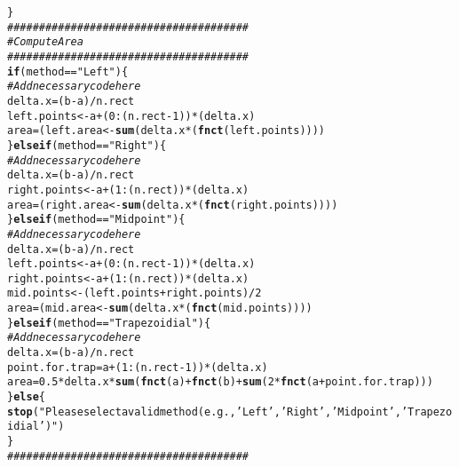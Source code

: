 \documentclass{article}\usepackage[]{graphicx}\usepackage[]{xcolor}
\makeatletter
\newcommand{\hlnum}[1]{\textcolor[rgb]{0.686,0.059,0.569}{#1}}%
\newcommand{\hlsng}[1]{\textcolor[rgb]{0.192,0.494,0.8}{#1}}%
\newcommand{\hlcom}[1]{\textcolor[rgb]{0.678,0.584,0.686}{\textit{#1}}}%
\newcommand{\hlopt}[1]{\textcolor[rgb]{0,0,0}{#1}}%
\newcommand{\hldef}[1]{\textcolor[rgb]{0.345,0.345,0.345}{#1}}%
\newcommand{\hlkwa}[1]{\textcolor[rgb]{0.161,0.373,0.58}{\textbf{#1}}}%
\newcommand{\hlkwb}[1]{\textcolor[rgb]{0.69,0.353,0.396}{#1}}%
\newcommand{\hlkwd}[1]{\textcolor[rgb]{0.737,0.353,0.396}{\textbf{#1}}}%
\newenvironment{kframe}{%
 \def\at@end@of@kframe{}%
 \ifinner\ifhmode%
  \def\at@end@of@kframe{\end{minipage}}%
  \begin{minipage}{\columnwidth}%
 \fi\fi%
 \def\FrameCommand##1{\hskip\@totalleftmargin \hskip-\fboxsep
 \colorbox{shadecolor}{##1}\hskip-\fboxsep
     \hskip-\linewidth \hskip-\@totalleftmargin \hskip\columnwidth}%
 \MakeFramed {\advance\hsize-\width
   \@totalleftmargin\z@ \linewidth\hsize
   \@setminipage}}%
 {\par\unskip\endMakeFramed%
 \at@end@of@kframe}
\newenvironment{knitrout}{}{} %
\makeatother
\begin{document}
\begin{enumerate}
\begin{enumerate}
\begin{knitrout}
\begin{kframe}
\begin{alltt}
  \hldef{\}}
  \hlcom{######################################}
  \hlcom{# Compute Area}
  \hlcom{######################################}
  \hlkwa{if}\hldef{(method} \hlopt{==} \hlsng{"Left"}\hldef{)\{}
    \hlcom{# Add necessary code here}
    \hldef{delta.x} \hlkwb{=} \hldef{(b}\hlopt{-}\hldef{a)}\hlopt{/}\hldef{n.rect}
    \hldef{left.points} \hlkwb{<-} \hldef{a} \hlopt{+} \hldef{(}\hlnum{0}\hlopt{:}\hldef{(n.rect}\hlopt{-}\hlnum{1}\hldef{))}\hlopt{*}\hldef{(delta.x)}
    \hldef{area} \hlkwb{=} \hldef{(left.area} \hlkwb{<-} \hlkwd{sum}\hldef{(delta.x}\hlopt{*}\hldef{(}\hlkwd{fnct}\hldef{(left.points))))}
  \hldef{\}}\hlkwa{else if}\hldef{(method} \hlopt{==} \hlsng{"Right"}\hldef{)\{}
    \hlcom{# Add necessary code here}
    \hldef{delta.x} \hlkwb{=} \hldef{(b}\hlopt{-}\hldef{a)}\hlopt{/}\hldef{n.rect}
    \hldef{right.points} \hlkwb{<-} \hldef{a} \hlopt{+} \hldef{(}\hlnum{1}\hlopt{:}\hldef{(n.rect))}\hlopt{*}\hldef{(delta.x)}
    \hldef{area} \hlkwb{=} \hldef{(right.area} \hlkwb{<-} \hlkwd{sum}\hldef{(delta.x}\hlopt{*}\hldef{(}\hlkwd{fnct}\hldef{(right.points))))}
  \hldef{\}}\hlkwa{else if}\hldef{(method} \hlopt{==} \hlsng{"Midpoint"}\hldef{)\{}
    \hlcom{# Add necessary code here}
    \hldef{delta.x} \hlkwb{=} \hldef{(b}\hlopt{-}\hldef{a)}\hlopt{/}\hldef{n.rect}
    \hldef{left.points} \hlkwb{<-} \hldef{a} \hlopt{+} \hldef{(}\hlnum{0}\hlopt{:}\hldef{(n.rect}\hlopt{-}\hlnum{1}\hldef{))}\hlopt{*}\hldef{(delta.x)}
    \hldef{right.points} \hlkwb{<-} \hldef{a} \hlopt{+} \hldef{(}\hlnum{1}\hlopt{:}\hldef{(n.rect))}\hlopt{*}\hldef{(delta.x)}
    \hldef{mid.points} \hlkwb{<-} \hldef{(left.points}\hlopt{+}\hldef{right.points)}\hlopt{/}\hlnum{2}
    \hldef{area} \hlkwb{=} \hldef{(mid.area} \hlkwb{<-} \hlkwd{sum}\hldef{(delta.x}\hlopt{*}\hldef{(}\hlkwd{fnct}\hldef{(mid.points))))}
  \hldef{\}}\hlkwa{else if}\hldef{(method} \hlopt{==} \hlsng{"Trapezoidial"}\hldef{)\{}
    \hlcom{# Add necessary code here}
    \hldef{delta.x} \hlkwb{=} \hldef{(b}\hlopt{-}\hldef{a)}\hlopt{/}\hldef{n.rect}
    \hldef{point.for.trap} \hlkwb{=} \hldef{a} \hlopt{+} \hldef{(}\hlnum{1}\hlopt{:}\hldef{(n.rect}\hlopt{-}\hlnum{1}\hldef{))}\hlopt{*}\hldef{(delta.x)}
    \hldef{area} \hlkwb{=} \hlnum{0.5}\hlopt{*}\hldef{delta.x}\hlopt{*}\hlkwd{sum}\hldef{(}\hlkwd{fnct}\hldef{(a)} \hlopt{+} \hlkwd{fnct}\hldef{(b)} \hlopt{+} \hlkwd{sum}\hldef{(}\hlnum{2}\hlopt{*}\hlkwd{fnct}\hldef{(a}\hlopt{+}\hldef{point.for.trap)))}
  \hldef{\}}\hlkwa{else}\hldef{\{}
    \hlkwd{stop}\hldef{(}\hlsng{"Please select a valid method (e.g., 'Left', 'Right', 'Midpoint', 'Trapezoidial')"}\hldef{)}
  \hldef{\}}
  \hlcom{######################################}

\end{alltt}
\end{kframe}
\end{knitrout}
\end{enumerate}
\end{enumerate}
\end{document}
